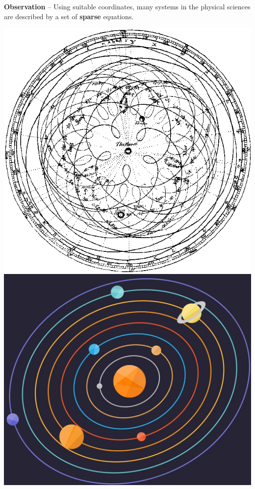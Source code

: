 \documentclass[aspectratio=169,compress,12pt]{beamer}
\begin{document}
\begin{frame}[plain]
    \vfill
    \begin{minipage}{.68\textwidth}
        \textbf{Observation} -- Using suitable coordinates, many systems in the physical sciences are described by a set of \textbf{sparse} equations.
    \end{minipage}%
    \hfill
    \begin{minipage}{.28\textwidth}
        \centering
        \begin{overprint}
            \includegraphics[width=\textwidth]{imgs/ptolemaic_system.png}
            \includegraphics[width=\textwidth]{imgs/solar_system.png}
        \end{overprint}
    \end{minipage}
    \vfill
\end{frame}
\end{document}

